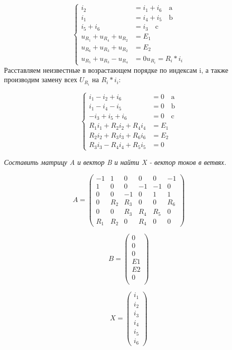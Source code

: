 \[
\left\{
\begin{aligned}
    i_2 &= i_1 + i_6 \quad \text{a} \\
    i_1 &= i_4 + i_5 \quad \text{b} \\
    i_5 + i_6 &= i_3 \quad \text{c} \\
    u_{R_1} + u_{R_4} + u_{R_2} &= E_1 \tag{abd} \\
    u_{R_6} + u_{R_3} + u_{R_2} &= E_2 \tag{acd} \\
    u_{R_5} + u_{R_3} - u_{R_4} &= 0 \tag{bcd}
    u_{R_i} = R_i * i_i
\end{aligned}
\right.
\]
Расставляем неизвестные в возрастающем порядке по индексам i, а также производим замену всех $U_{R_i}$ на $R_i * i_i$:

\[
\left\{
\begin{aligned}
    i_1-i_2+i_6 &= 0 \quad \text{a} \\
    i_1-i_4-i_5 &= 0 \quad \text{b} \\
    -i_3+i_5+i_6 &= 0 \quad \text{c} \\
    R_1 i_1 + R_2 i_2 + R_4 i_4 &= E_1 \tag{abd} \\
    R_2 i_2 + R_3 i_3 + R_6 i_6 &= E_2 \tag{acd} \\
    R_3 i_3 - R_4 i_4 + R_5 i_5 &= 0 \tag{bcd}
\end{aligned}
\right.
\]


\textit{Составить матрицу A и вектор B и найти X - вектор токов в ветвях.}

$$A = \begin{pmatrix}
-1 &  1 &  0 &  0 &  0 & -1 \\
 1 &  0 &  0 & -1 & -1 &  0 \\
 0 &  0 & -1 &  0 &  1 &  1 \\
 0 & R_2 & R_3 &  0 &  0 & R_6 \\
 0 &  0 & R_3 & R_4 & R_5 &  0 \\
R_1 & R_2 &  0 & R_4 &  0 &  0
\end{pmatrix}$$

$$B = \begin{pmatrix}
0 \\
0 \\
0 \\
E1 \\
E2 \\
0 \\
\end{pmatrix}$$

$$X = \begin{pmatrix}
i_1 \\
i_2 \\
i_3 \\
i_4 \\
i_5 \\
i_6
\end{pmatrix}$$

